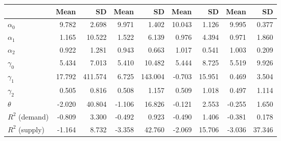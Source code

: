 
\begin{tabular}[t]{lrrrrrrrr}
\toprule
  & Mean & SD & Mean  & SD  & Mean   & SD   & Mean    & SD   \\
\midrule
$\alpha_{0}$ & 9.782 & 2.698 & 9.971 & 1.402 & 10.043 & 1.126 & 9.995 & 0.377\\
$\alpha_{1}$ & 1.165 & 10.522 & 1.522 & 6.139 & 0.976 & 4.394 & 0.971 & 1.860\\
$\alpha_{2}$ & 0.922 & 1.281 & 0.943 & 0.663 & 1.017 & 0.541 & 1.003 & 0.209\\
$\gamma_{0}$ & 5.434 & 7.013 & 5.410 & 10.482 & 5.444 & 8.725 & 5.519 & 9.926\\
$\gamma_{1}$ & 17.792 & 411.574 & 6.725 & 143.004 & -0.703 & 15.951 & 0.469 & 3.504\\
$\gamma_{2}$ & 0.505 & 0.816 & 0.508 & 1.157 & 0.509 & 1.018 & 0.497 & 1.114\\
$\theta$ & -2.020 & 40.804 & -1.106 & 16.826 & -0.121 & 2.553 & -0.255 & 1.650\\
$R^{2}$ (demand) & -0.809 & 3.300 & -0.492 & 0.923 & -0.490 & 1.406 & -0.381 & 0.178\\
$R^{2}$ (supply) & -1.164 & 8.732 & -3.358 & 42.760 & -2.069 & 15.706 & -3.036 & 37.346\\
\bottomrule
\end{tabular}
